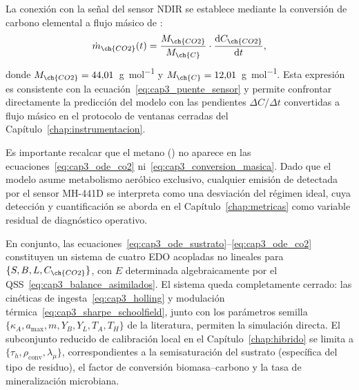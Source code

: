 La conexión con la señal del sensor NDIR se establece mediante la conversión de carbono elemental a flujo másico de :
\begin{equation}
    \dot{m}_{\ch{CO2}}(t) = \frac{M_{\ch{CO2}}}{M_{\ch{C}}} \cdot \frac{\mathrm{d}C_{\ch{CO2}}}{\mathrm{d}t},
    \label{eq:cap3_conversion_masica}
\end{equation}
donde $M_{\ch{CO2}} = 44{,}01$~\si{\gram\per\mol} y $M_{\ch{C}} = 12{,}01$~\si{\gram\per\mol}. Esta expresión es consistente con la ecuación~\eqref{eq:cap3_puente_sensor} y permite confrontar directamente la predicción del modelo con las pendientes $\Delta C/\Delta t$ convertidas a flujo másico en el protocolo de ventanas cerradas del Capítulo~\ref{chap:instrumentacion}.

Es importante recalcar que el metano () no aparece en las ecuaciones~\eqref{eq:cap3_ode_co2} ni~\eqref{eq:cap3_conversion_masica}. Dado que el modelo asume metabolismo aeróbico exclusivo, cualquier emisión de  detectada por el sensor MH-441D se interpreta como una desviación del régimen ideal, cuya detección y cuantificación se aborda en el Capítulo~\ref{chap:metricas} como variable residual de diagnóstico operativo.

En conjunto, las ecuaciones~\eqref{eq:cap3_ode_sustrato}--\eqref{eq:cap3_ode_co2} constituyen un sistema de cuatro EDO acopladas no lineales para $\{S, B, L, C_{\ch{CO2}}\}$, con $E$ determinada algebraicamente por el QSS~\eqref{eq:cap3_balance_asimilados}. El sistema queda completamente cerrado: las cinéticas de ingesta~\eqref{eq:cap3_holling} y modulación térmica~\eqref{eq:cap3_sharpe_schoolfield}, junto con los parámetros semilla $\{\kappa_A, a_{\max}, m, Y_B, Y_L, T_A, T_H\}$ de la literatura, permiten la simulación directa. El subconjunto reducido de calibración local en el Capítulo~\ref{chap:hibrido} se limita a $\{\tau_h, \rho_{\mathrm{conv}}, \lambda_{\mu}\}$, correspondientes a la semisaturación del sustrato (específica del tipo de residuo), el factor de conversión biomasa--carbono y la tasa de mineralización microbiana.